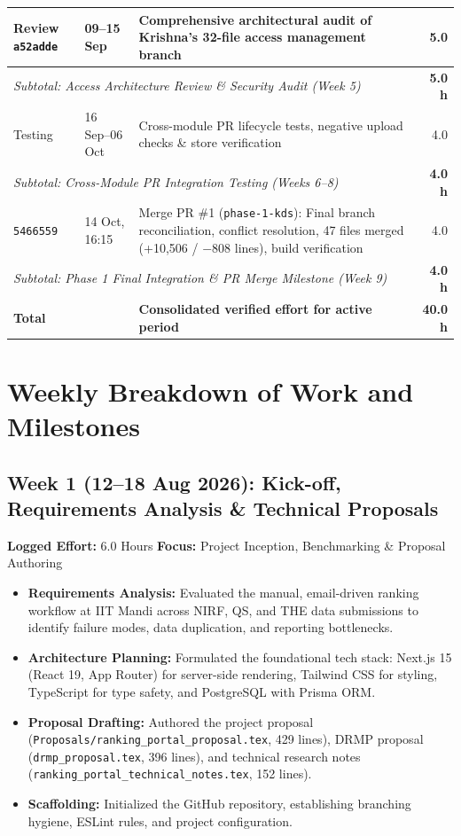 \documentclass[11pt,a4paper]{article}
\begin{document}
\begin{table}[h]
\begin{tabular}{p{2.2cm} p{2.2cm} p{7.2cm} r}
\midrule
Review \texttt{a52adde} & 09--15 Sep & Comprehensive architectural audit of Krishna's 32-file access management branch & 5.0 \\
\midrule
\multicolumn{3}{l}{\textit{Subtotal: Access Architecture Review \& Security Audit (Week 5)}} & \textbf{5.0 h} \\
\midrule
Testing & 16 Sep--06 Oct & Cross-module PR lifecycle tests, negative upload checks \& store verification & 4.0 \\
\midrule
\multicolumn{3}{l}{\textit{Subtotal: Cross-Module PR Integration Testing (Weeks 6--8)}} & \textbf{4.0 h} \\
\midrule
\texttt{5466559} & 14 Oct, 16:15 & Merge PR \#1 (\texttt{phase-1-kds}): Final branch reconciliation, conflict resolution, 47 files merged (+10,506 / $-$808 lines), build verification & 4.0 \\
\midrule
\multicolumn{3}{l}{\textit{Subtotal: Phase 1 Final Integration \& PR Merge Milestone (Week 9)}} & \textbf{4.0 h} \\
\midrule
\textbf{Total} & & \textbf{Consolidated verified effort for active period} & \textbf{40.0 h} \\
\bottomrule
\end{tabular}
\end{table}

\section*{Weekly Breakdown of Work and Milestones}

\subsection*{Week 1 (12--18 Aug 2026): Kick-off, Requirements Analysis \& Technical Proposals}
\textbf{Logged Effort:} 6.0 Hours \quad \textbf{Focus:} Project Inception, Benchmarking \& Proposal Authoring
\begin{itemize}[leftmargin=1.4em, itemsep=2pt]
\item \textbf{Requirements Analysis:} Evaluated the manual, email-driven ranking workflow at IIT Mandi across NIRF, QS, and THE data submissions to identify failure modes, data duplication, and reporting bottlenecks.
\item \textbf{Architecture Planning:} Formulated the foundational tech stack: Next.js 15 (React 19, App Router) for server-side rendering, Tailwind CSS for styling, TypeScript for type safety, and PostgreSQL with Prisma ORM.
\item \textbf{Proposal Drafting:} Authored the project proposal (\texttt{Proposals/ranking\_portal\_proposal.tex}, 429 lines), DRMP proposal (\texttt{drmp\_proposal.tex}, 396 lines), and technical research notes (\texttt{ranking\_portal\_technical\_notes.tex}, 152 lines).
\item \textbf{Scaffolding:} Initialized the GitHub repository, establishing branching hygiene, ESLint rules, and project configuration.
\end{itemize}
\end{document}
